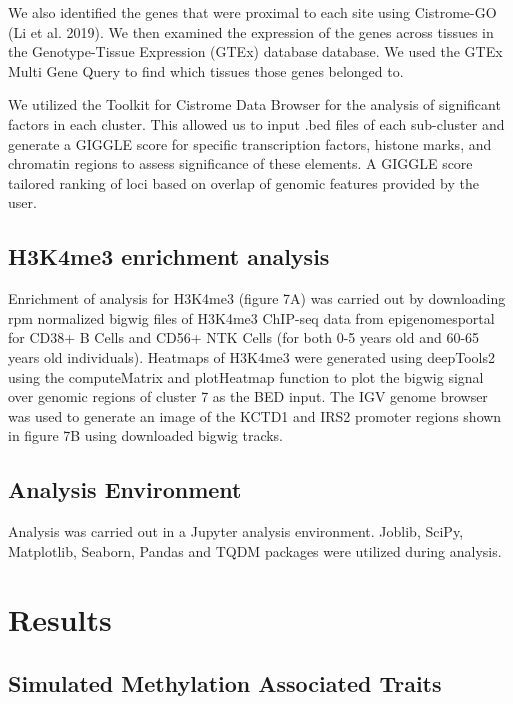\documentclass{article}
\begin{document}
{\begin{linenumbers}
We also identified the genes that were proximal to each site using Cistrome-GO (Li et al. 2019). We then 
examined the expression of the genes across tissues in the Genotype-Tissue Expression (GTEx) database database. 
We used the GTEx Multi Gene Query to find which tissues those genes belonged to. 

We utilized the Toolkit for Cistrome Data Browser \cite{Zheng2019-vm,Mei2017-yq} for the analysis of significant factors in each cluster. This allowed 
us to input .bed files of each sub-cluster and generate a GIGGLE score for specific transcription factors, histone marks, 
and chromatin regions to assess significance of these elements. A GIGGLE score tailored ranking of loci based on overlap 
of genomic features provided by the user\cite{Layer2018-gr}.


\subsection{H3K4me3 enrichment analysis} 
Enrichment of analysis for H3K4me3 (figure 7A) was carried out by downloading rpm normalized bigwig files of H3K4me3 ChIP-seq data from 
epigenomesportal\cite{Bujold2016-vk} for CD38+ B Cells and CD56+ NTK Cells (for both 0-5 years old and 60-65 years old individuals). 
Heatmaps of H3K4me3 were generated using deepTools2\cite{Ramirez2016-xl} using the computeMatrix and plotHeatmap function to plot the 
bigwig signal over genomic regions of cluster 7 as the BED input. The IGV genome browser\cite{Robinson2011-he} was used to generate an image of the KCTD1 
and IRS2 promoter regions shown in figure 7B using downloaded bigwig tracks.


\subsection{Analysis Environment}
Analysis was carried out in a Jupyter\cite{Basu_undated-vq} analysis environment. 
Joblib\cite{Varoquaux2009-al}, SciPy\cite{Virtanen2020-wt}, Matplotlib\cite{Hunter2007-nq}, 
Seaborn\cite{Waskom2021-gj}, Pandas\cite{McKinney2012-ta} and TQDM\cite{Da_Costa-Luis2019-lr} 
packages were utilized during analysis. 



\section{Results}\label{sec3}

\subsection{Simulated Methylation Associated Traits}


\end{linenumbers}}
\end{document}
